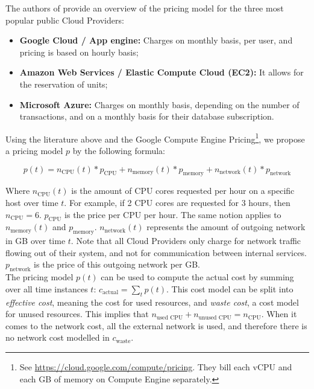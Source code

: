 \noindent
The authors of \cite{mazrekaj2016pricing} provide an overview of the pricing model for the three most popular public Cloud Providers:
\begin{itemize}
    \item \textbf{Google Cloud / App engine: }Charges on monthly basis, per user, and pricing is based on hourly basis;
    \item \textbf{Amazon Web Services / Elastic Compute Cloud (EC2): }It allows for the reservation of units;
    \item \textbf{Microsoft Azure: }Charges on monthly basis, depending on the number of transactions, and on a monthly basis for their database subscription.
\end{itemize}

\noindent
Using the literature above and the Google Compute Engine Pricing\footnote{See \url{https://cloud.google.com/compute/pricing}. They bill each vCPU and each GB of memory on Compute Engine separately.}, we propose a pricing model $p$ by the following formula:

\begin{equation} \label{eq:p}
p(t) = n_\text{CPU}(t) * p_\text{CPU} + n_\text{memory}(t) * p_\text{memory} + n_\text{network}(t) * p_\text{network}
\end{equation}

\noindent
Where $n_\text{CPU}(t)$ is the amount of CPU cores requested per hour on a specific host over time $t$. For example, if 2 CPU cores are requested for 3 hours, then $n_\text{CPU} = 6$. $p_\text{CPU}$ is the price per CPU per hour. The same notion applies to $n_\text{memory}(t)$ and $p_\text{memory}$. $n_\text{network}(t)$ represents the amount of outgoing network in GB over time $t$. Note that all Cloud Providers only charge for network traffic flowing out of their system, and not for communication between internal services. $p_\text{network}$ is the price of this outgoing network per GB.\\

\noindent
The pricing model $p(t)$ can be used to compute the actual cost by summing over all time instances $t$: $c_\text{actual} = \sum_t p(t)$. This cost model can be split into \textit{effective cost}, meaning the cost for used resources, and \textit{waste cost}, a cost model for unused resources. This implies that $n_\text{used CPU} + n_\text{unused CPU} = n_\text{CPU}$. When it comes to the network cost, all the external network is used, and therefore there is no network cost modelled in $c_\text{waste}$. 


